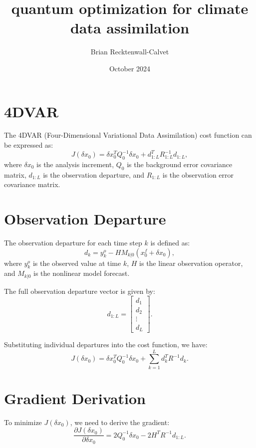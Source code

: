\documentclass{article}
\title{quantum optimization for climate data assimilation}
\author{Brian Recktenwall-Calvet}
\date{October 2024}
\begin{document}
\maketitle

\section{4DVAR}
The 4DVAR (Four-Dimensional Variational Data Assimilation) cost function can be expressed as:
\begin{equation}
J(\delta x_0) = \delta x_0^T Q_0^{-1} \delta x_0 + d_{1:L}^T R_{1:L}^{-1} d_{1:L},
\end{equation}
where \( \delta x_0 \) is the analysis increment, \( Q_0 \) is the background error covariance matrix, \( d_{1:L} \) is the observation departure, and \( R_{1:L} \) is the observation error covariance matrix.

\section{Observation Departure}
The observation departure for each time step \( k \) is defined as:
\begin{equation}
d_k = y^o_k - H M_{k|0}(x^f_0 + \delta x_0),
\end{equation}
where \( y^o_k \) is the observed value at time \( k \), \( H \) is the linear observation operator, and \( M_{k|0} \) is the nonlinear model forecast.

The full observation departure vector is given by:
\begin{equation}
d_{1:L} = \begin{bmatrix}
d_1 \\
d_2 \\
\vdots \\
d_L
\end{bmatrix}.
\end{equation}

Substituting individual departures into the cost function, we have:
\begin{equation}
J(\delta x_0) = \delta x_0^T Q_0^{-1} \delta x_0 + \sum_{k=1}^L d_k^T R^{-1} d_k.
\end{equation}

\section{Gradient Derivation}
To minimize \( J(\delta x_0) \), we need to derive the gradient:
\begin{equation}
\frac{\partial J(\delta x_0)}{\partial \delta x_0} = 2 Q_0^{-1} \delta x_0 - 2 H^T R^{-1} d_{1:L}.
\end{equation}
\end{document}
